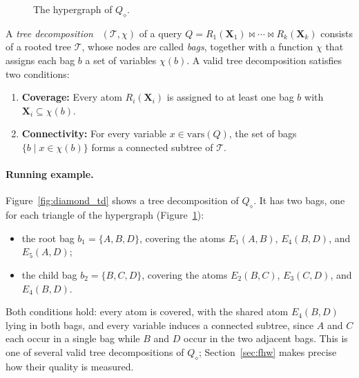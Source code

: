 \begin{figure}[ht]
  \centering
  \caption{The hypergraph of $Q_\diamond$.}
  \label{fig:diamond_hypergraph}
\end{figure}

\medskip

A \emph{tree decomposition}~\cite{cygan2015} $(\mathcal{T}, \chi)$ of a query $Q = R_1(\mathbf{X}_1) \bowtie \cdots \bowtie R_k(\mathbf{X}_k)$ consists of a rooted tree $\mathcal{T}$, whose nodes are called \emph{bags}, together with a function $\chi$ that assigns each bag $b$ a set of variables $\chi(b)$.
A valid tree decomposition satisfies two conditions:

\begin{enumerate}
    \item \textbf{Coverage:} Every atom $R_i(\mathbf{X}_i)$ is assigned to at least one bag $b$ with $\mathbf{X}_i \subseteq \chi(b)$.
    \item \textbf{Connectivity:} For every variable $x \in \mathrm{vars}(Q)$, the set of bags $\{b \mid x \in \chi(b)\}$ forms a connected subtree of $\mathcal{T}$.
\end{enumerate}

\paragraph{Running example.}
Figure~\ref{fig:diamond_td} shows a tree decomposition of $Q_\diamond$. It has two bags, one for each triangle of the hypergraph (Figure~\ref{fig:diamond_hypergraph}):
\begin{itemize}
    \item the root bag $b_1 = \{A, B, D\}$, covering the atoms $E_1(A,B)$, $E_4(B,D)$, and $E_5(A,D)$;
    \item the child bag $b_2 = \{B, C, D\}$, covering the atoms $E_2(B,C)$, $E_3(C,D)$, and $E_4(B,D)$.
\end{itemize}
Both conditions hold: every atom is covered, with the shared atom $E_4(B,D)$ lying in both bags, and every variable induces a connected subtree, since $A$ and $C$ each occur in a single bag while $B$ and $D$ occur in the two adjacent bags.
This is one of several valid tree decompositions of $Q_\diamond$; Section~\ref{sec:fhw} makes precise how their quality is measured.

